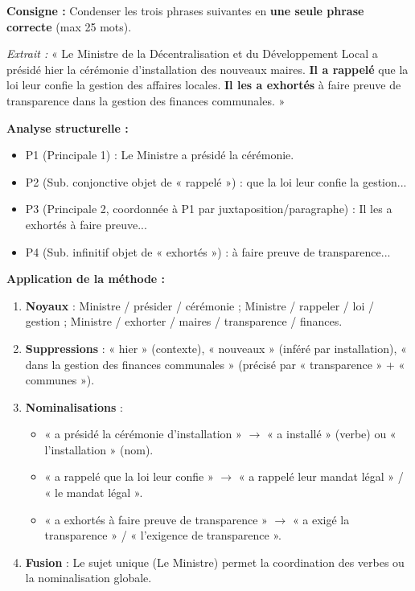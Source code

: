 \documentclass[11pt]{article}
\begin{document}
\begin{exoresolu}
\textbf{Consigne :} Condenser les trois phrases suivantes en \textbf{une seule phrase correcte} (max 25 mots).

\textit{Extrait :} « Le Ministre de la Décentralisation et du Développement Local a présidé hier la cérémonie d'installation des nouveaux maires. \textbf{Il a rappelé} que la loi leur confie la gestion des affaires locales. \textbf{Il les a exhortés} à faire preuve de transparence dans la gestion des finances communales. »

\textbf{Analyse structurelle :}
\begin{itemize}
\item P1 (Principale 1) : Le Ministre a présidé la cérémonie.
\item P2 (Sub. conjonctive objet de « rappelé ») : que la loi leur confie la gestion...
\item P3 (Principale 2, coordonnée à P1 par juxtaposition/paragraphe) : Il les a exhortés à faire preuve...
\item P4 (Sub. infinitif objet de « exhortés ») : à faire preuve de transparence...
\end{itemize}

\textbf{Application de la méthode :}
\begin{enumerate}
\item \textbf{Noyaux} : Ministre / présider / cérémonie ; Ministre / rappeler / loi / gestion ; Ministre / exhorter / maires / transparence / finances.
\item \textbf{Suppressions} : « hier » (contexte), « nouveaux » (inféré par installation), « dans la gestion des finances communales » (précisé par « transparence » + « communes »).
\item \textbf{Nominalisations} : 
    \begin{itemize}
    \item « a présidé la cérémonie d'installation » $\rightarrow$ « a installé » (verbe) ou « l'installation » (nom).
    \item « a rappelé que la loi leur confie » $\rightarrow$ « a rappelé leur mandat légal » / « le mandat légal ».
    \item « a exhortés à faire preuve de transparence » $\rightarrow$ « a exigé la transparence » / « l'exigence de transparence ».
    \end{itemize}
\item \textbf{Fusion} : Le sujet unique (Le Ministre) permet la coordination des verbes ou la nominalisation globale.
\end{enumerate}


\end{exoresolu}
\end{document}
